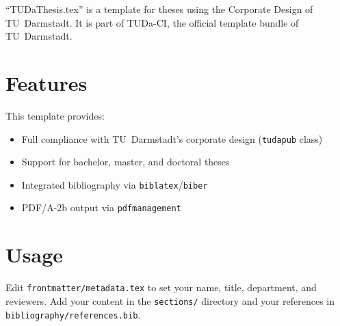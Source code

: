 
\enquote{TUDaThesis.tex} is a template for theses using the Corporate Design of TU~Darmstadt.
It is part of TUDa-CI, the official template bundle of TU~Darmstadt.

\section{Features}

This template provides:
\begin{itemize}
  \item Full compliance with TU~Darmstadt's corporate design (\texttt{tudapub} class)
  \item Support for bachelor, master, and doctoral theses
  \item Integrated bibliography via \texttt{biblatex}/\texttt{biber} \cite{tuda-ci}
  \item PDF/A-2b output via \texttt{pdfmanagement}
\end{itemize}

\section{Usage}

Edit \texttt{frontmatter/metadata.tex} to set your name, title, department, and reviewers.
Add your content in the \texttt{sections/} directory and your references in
\texttt{bibliography/references.bib}.

\printbibliography
